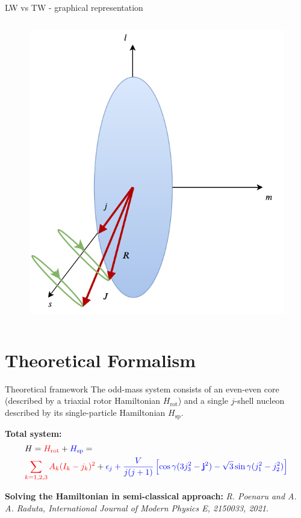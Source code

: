 \documentclass{beamer}
\begin{document}
\begin{frame}{LW vs TW - graphical representation}
\begin{columns}
\begin{column}{0.5\textwidth}
\begin{figure}
  \includegraphics[scale=0.6]{figs/transverseWobbler.pdf}

      \end{figure}
    \end{column}
    \end{columns}

\end{frame}

\section{Theoretical Formalism}

\begin{frame}{Theoretical framework}
  The odd-mass system consists of an {\color{red}even-even core} (described by a triaxial rotor Hamiltonian {\color{red}$H_\text{rot}$}) and a single {\color{blue}$j$-shell nucleon} described by its single-particle Hamiltonian {\color{blue}$H_\text{sp}$}.
  \par \textbf{Total system:}
  \begin{align}
    &H={\color{red}H_\text{rot}}+{\color{blue}H_\text{sp}}=\\
&{\color{red}\sum_{k=1,2,3}A_k(I_k-j_k)^2}+{\color{blue}\epsilon_j+\frac{V}{j(j+1)}\left[\cos\gamma(3j_3^2-\mathbf{j}^2)-\sqrt{3}\sin\gamma(j_1^2-j_2^2)\right]}
  \end{align}
  \par \textbf{Solving the Hamiltonian in semi-classical approach:} \textit{R. Poenaru and A. A. Raduta, International Journal of Modern Physics E, 2150033, 2021}.
\end{frame}
\end{document}
